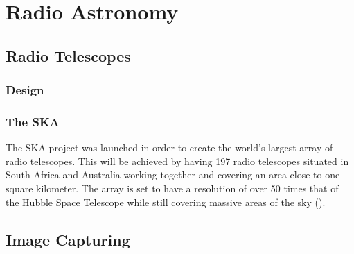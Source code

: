 \section{Radio Astronomy}\label{ra}
\subsection{Radio Telescopes}\label{ra:sec:rt}
%
\subsubsection{Design}\label{ra:ssec:des}
%
\subsubsection{The SKA}
The SKA project was launched in order to create the world's largest array of radio telescopes. This will be achieved by having 197 radio telescopes situated in South Africa and Australia working together and covering an area close to one square kilometer. The array is set to have a resolution of over 50 times that of the Hubble Space Telescope while still covering massive areas of the sky (\cite{SKAsite}).
\subsection{Image Capturing}\label{ra:sec:ic}
%
